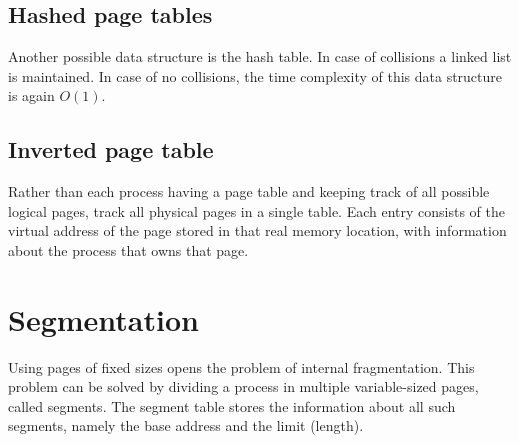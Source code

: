 
\subsection{Hashed page tables}
Another possible data structure is the hash table. In case of collisions a linked list is maintained. In case of no collisions, the time complexity of this data structure is again $O(1)$.


\subsection{Inverted page table}
Rather than each process having a page table and keeping track of all possible logical pages, track all physical pages in a single table. Each entry consists of the virtual address of the page stored in that real memory location, with information about the process that owns that page.

\section{Segmentation}
Using pages of fixed sizes opens the problem of internal fragmentation. This problem can be solved by dividing a process in multiple variable-sized pages, called segments. The segment table stores the information about all such segments, namely the base address and the limit (length).

